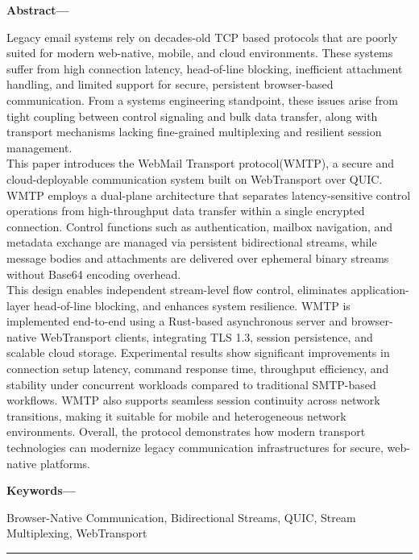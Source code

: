 \documentclass[10pt,a4paper]{article}
\begin{document}
\noindent
{\fontsize{9pt}{11pt}\selectfont\bfseries
Abstract—}
{\fontsize{9pt}{11pt}\selectfont
Legacy email systems rely on decades-old TCP based protocols that are poorly suited for modern web-native, mobile, and cloud environments. These systems suffer from high connection latency, head-of-line blocking, inefficient attachment handling, and limited support for secure, persistent browser-based communication. From a systems engineering standpoint, these issues arise from tight coupling between control signaling and bulk data transfer, along with transport mechanisms lacking fine-grained multiplexing and resilient session management.\\
This paper introduces the WebMail Transport protocol(WMTP), a secure and cloud-deployable communication system built on WebTransport over QUIC. WMTP employs a dual-plane architecture that separates latency-sensitive control operations from high-throughput data transfer within a single encrypted connection. Control functions such as authentication, mailbox navigation, and metadata exchange are managed via persistent bidirectional streams, while message bodies and attachments are delivered over ephemeral binary streams without Base64 encoding overhead.\\
This design enables independent stream-level flow control, eliminates application-layer head-of-line blocking, and enhances system resilience. WMTP is implemented end-to-end using a Rust-based asynchronous server and browser-native WebTransport clients, integrating TLS 1.3, session persistence, and scalable cloud storage. Experimental results show significant improvements in connection setup latency, command response time, throughput efficiency, and stability under concurrent workloads compared to traditional SMTP-based workflows. WMTP also supports seamless session continuity across network transitions, making it suitable for mobile and heterogeneous network environments. Overall, the protocol demonstrates how modern transport technologies can modernize legacy communication infrastructures for secure, web-native platforms.
\par}

\vspace{6pt}

\noindent
{\fontsize{9pt}{11pt}\selectfont\bfseries
Keywords—}
{\fontsize{9pt}{11pt}\selectfont
Browser-Native Communication, Bidirectional Streams, QUIC, Stream Multiplexing, WebTransport
\par}

\vspace{6pt}
\hrule
\vspace{12pt}
\end{document}
